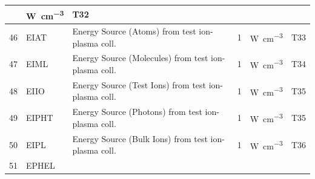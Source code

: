\begin{landscape}
\begin{longtable}{|r|l|l|l|l|c|}
                                                                   &
    \si{\watt\per\cubic\centi\metre}                               & T32
    \\  \hline
    46                                                             & EIAT
                                                                   & Energy Source (Atoms)
    from test ion-plasma coll.
                                                                   & 1
                                                                   &
    \si{\watt\per\cubic\centi\metre}                               & T33
    \\  \hline
    47                                                             & EIML
                                                                   & Energy Source (Molecules)
    from test ion-plasma coll.
                                                                   & 1
                                                                   &
    \si{\watt\per\cubic\centi\metre}                               & T34
    \\ \hline
    48                                                             & EIIO
                                                                   & Energy Source (Test Ions)
    from test ion-plasma coll.
                                                                   & 1
                                                                   &
    \si{\watt\per\cubic\centi\metre}                               & T35
    \\  \hline
    49                                                             & EIPHT
                                                                   & Energy Source (Photons)
    from test ion-plasma coll.
                                                                   & 1
                                                                   &
    \si{\watt\per\cubic\centi\metre}                               & T35
    \\  \hline
    50                                                             & EIPL
                                                                   & Energy Source (Bulk Ions)
    from test ion-plasma coll.
                                                                   & 1
                                                                   &
    \si{\watt\per\cubic\centi\metre}                               & T36
    \\  \hline
    51                                                             & EPHEL

\end{longtable}
\end{landscape}
